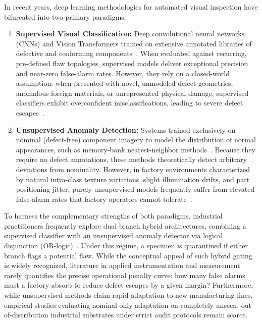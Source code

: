 \documentclass[journal]{IEEEtran}
\begin{document}
In recent years, deep learning methodologies for automated visual inspection have bifurcated into two primary paradigms:
\begin{enumerate}
    \item \textbf{Supervised Visual Classification:} Deep convolutional neural networks (CNNs) and Vision Transformers trained on extensive annotated libraries of defective and conforming components~\cite{tan2019efficientnet,weimer2016design}. When evaluated against recurring, pre-defined flaw topologies, supervised models deliver exceptional precision and near-zero false-alarm rates. However, they rely on a closed-world assumption: when presented with novel, unmodeled defect geometries, anomalous foreign materials, or unrepresented physical damage, supervised classifiers exhibit overconfident misclassifications, leading to severe defect escapes~\cite{weimer2016design}.
    \item \textbf{Unsupervised Anomaly Detection:} Systems trained exclusively on nominal (defect-free) component imagery to model the distribution of normal appearances, such as memory-bank nearest-neighbor methods~\cite{roth2022towards,defard2021padim,cohen2020sub}. Because they require no defect annotations, these methods theoretically detect arbitrary deviations from nominality. However, in factory environments characterized by natural intra-class texture variations, slight illumination drifts, and part positioning jitter, purely unsupervised models frequently suffer from elevated false-alarm rates that factory operators cannot tolerate~\cite{roth2022towards,weimer2016design}.
\end{enumerate}

To harness the complementary strengths of both paradigms, industrial practitioners frequently explore dual-branch hybrid architectures, combining a supervised classifier with an unsupervised anomaly detector via logical disjunction (OR-logic)~\cite{weimer2016design}. Under this regime, a specimen is quarantined if either branch flags a potential flaw. While the conceptual appeal of such hybrid gating is widely recognized, literature in applied instrumentation and measurement rarely quantifies the precise operational penalty curve: how many false alarms must a factory absorb to reduce defect escapes by a given margin? Furthermore, while unsupervised methods claim rapid adaptation to new manufacturing lines, empirical studies evaluating nominal-only adaptation on completely unseen, out-of-distribution industrial substrates under strict audit protocols remain scarce.
\end{document}
